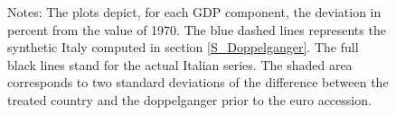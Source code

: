 \documentclass[12pt]{article}
\newcommand{\annote}[1]{\parbox{\textwidth}{\renewcommand{\baselinestretch}{1.0}\vspace{12pt} \small Notes: #1}}
\begin{document}
\begin{figure}[h!]
    \annote{The plots depict, for each GDP component, the deviation in percent from the value of 1970. The blue dashed lines represents the synthetic Italy computed in section \ref{S_Doppelganger}. The full black lines stand for the actual Italian series. The shaded area corresponds to two standard deviations of the difference between the treated country and the doppelganger prior to the euro accession. }
\end{figure}
\end{document}

